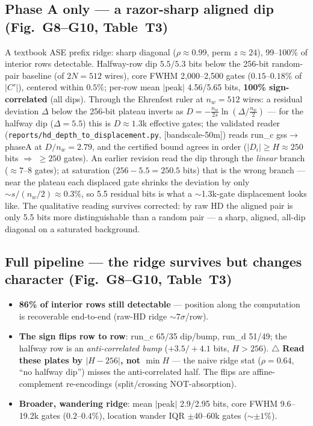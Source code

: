 \documentclass[11pt]{article}
\newcommand{\code}[1]{\texttt{#1}}
\newcommand{\Di}{\lvert D_i\rvert}
\begin{document}
\subsection{Phase A only --- a razor-sharp aligned dip (Fig.~G8--G10, Table~T3)}
A textbook ASE prefix ridge: sharp diagonal ($\rho\approx0.99$, perm $z\approx24$), 99--100\% of
interior rows detectable. Halfway-row dip $5.5/5.3$ bits below the 256-bit random-pair baseline (of
$2N{=}512$ wires), core FWHM 2{,}000--2{,}500 gates ($0.15$--$0.18\%$ of $|C'|$), centered within
$0.5\%$; per-row mean $|$peak$|$ 4.56/5.65 bits, \textbf{100\% sign-correlated} (all dips). Through the
Ehrenfest ruler at $n_w{=}512$ wires: a residual deviation $\Delta$ below the 256-bit plateau inverts
as $D=-\tfrac{n_w}{2s}\ln(\Delta/\tfrac{n_w}{2})$ --- for the halfway dip ($\Delta=5.5$) this is
$D\approx1.3$k effective gates; the validated reader (\code{reports/hd\_depth\_to\_displacement.py},
[bandscale-50m]) reads run\_c gss$\to$phaseA at $D/n_w=2.79$, and the certified bound agrees in order
($\Di\ge H\approx250$ bits $\Rightarrow$ $\ge250$ gates). An earlier revision read the dip through
the \emph{linear} branch ($\approx7$--$8$ gates); at saturation ($256-5.5=250.5$ bits) that is the
wrong branch --- near the plateau each displaced gate shrinks the deviation by only
$\sim s/(n_w/2)\approx0.3\%$, so 5.5 residual bits is what a $\sim$1.3k-gate displacement looks like.
The qualitative reading survives corrected: by raw HD the aligned pair is only 5.5 bits more
distinguishable than a random pair --- a sharp, aligned, all-dip diagonal on a saturated background.

\subsection{Full pipeline --- the ridge survives but changes character (Fig.~G8--G10, Table~T3)}
\begin{itemize}
\item \textbf{86\% of interior rows still detectable} --- position along the computation is recoverable
end-to-end (raw-HD ridge $\sim7\sigma$/row).
\item \textbf{The sign flips row to row}: run\_c 65/35 dip/bump, run\_d 51/49; the halfway row is an
\emph{anti-correlated bump} ($+3.5/+4.1$ bits, $H>256$).
$\triangle$ \textbf{Read these plates by $|H-256|$, not $\min H$} --- the naive ridge stat
($\rho=0.64$, ``no halfway dip'') misses the anti-correlated half. The flips are affine-complement
re-encodings (split/crossing NOT-absorption).
\item \textbf{Broader, wandering ridge}: mean $|$peak$|$ 2.9/2.95 bits, core FWHM 9.6--19.2k gates
($0.2$--$0.4\%$), location wander IQR $\pm40$--60k gates ($\sim\pm1\%$).
\end{itemize}
\end{document}
